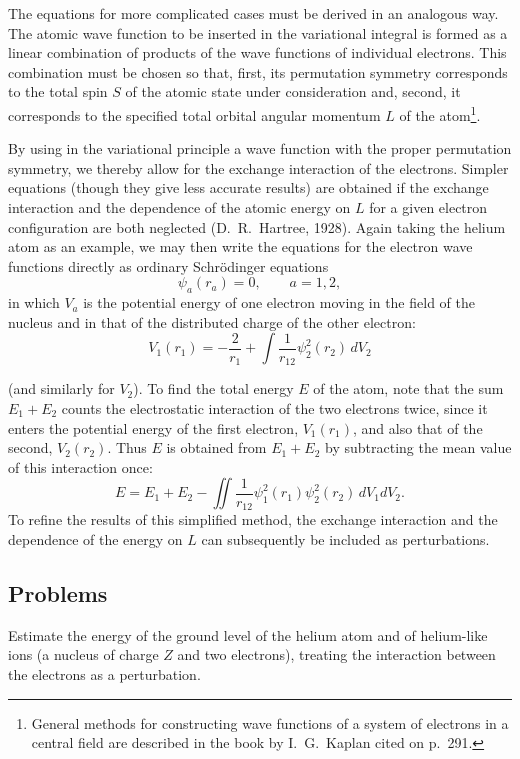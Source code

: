 The equations for more complicated cases must be derived in an analogous way. The atomic wave function to be inserted in the variational integral is formed as a linear combination of products of the wave functions of individual electrons. This combination must be chosen so that, first, its permutation symmetry corresponds to the total spin $S$ of the atomic state under consideration and, second, it corresponds to the specified total orbital angular momentum $L$ of the atom\footnote{General methods for constructing wave functions of a system of electrons in a central field are described in the book by I.~G.~Kaplan cited on p.~291.}.

By using in the variational principle a wave function with the proper permutation symmetry, we thereby allow for the exchange interaction of the electrons. Simpler equations (though they give less accurate results) are obtained if the exchange interaction and the dependence of the atomic energy on $L$ for a given electron configuration are both neglected (D.~R.~Hartree, 1928). Again taking the helium atom as an example, we may then write the equations for the electron wave functions directly as ordinary Schrödinger equations
\begin{equation}
 [\tfrac12\Delta_a+E_a-V_a(r_a)]\psi_a(r_a)=0,\qquad a=1,2,
 \tag{69.7}
\end{equation}
in which $V_a$ is the potential energy of one electron moving in the field of the nucleus and in that of the distributed charge of the other electron:
\begin{equation}
 V_1(r_1)=-\frac2{r_1}+\int\frac1{r_{12}}\psi_2^2(r_2)\,dV_2
 \tag{69.8}
\end{equation}

(and similarly for $V_2$). To find the total energy $E$ of the atom, note that the sum $E_1+E_2$ counts the electrostatic interaction of the two electrons twice, since it enters the potential energy of the first electron, $V_1(r_1)$, and also that of the second, $V_2(r_2)$. Thus $E$ is obtained from $E_1+E_2$ by subtracting the mean value of this interaction once:
\begin{equation}
 E=E_1+E_2-\iint\frac1{r_{12}}\psi_1^2(r_1)\psi_2^2(r_2)\,dV_1dV_2.
 \tag{69.9}
\end{equation}
To refine the results of this simplified method, the exchange interaction and the dependence of the energy on $L$ can subsequently be included as perturbations.

\subsection*{Problems}
 Estimate the energy of the ground level of the helium atom and of helium-like ions (a nucleus of charge $Z$ and two electrons), treating the interaction between the electrons as a perturbation.


